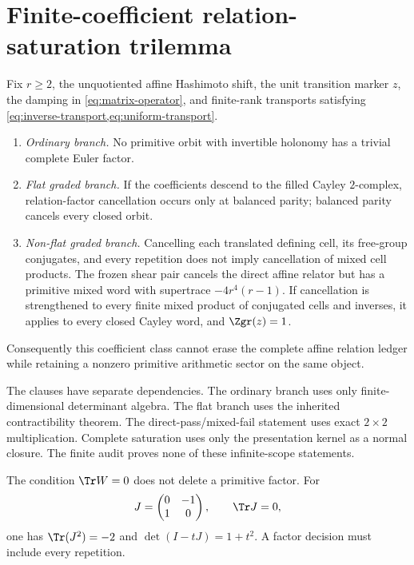 \section{Finite-coefficient relation-saturation trilemma}
\label{sec:theorem}

\begin{theorem}
\label{thm:saturation}
Fix $r\ge2$, the unquotiented affine Hashimoto shift, the unit transition
marker $z$, the damping in \cref{eq:matrix-operator}, and finite-rank
transports satisfying \cref{eq:inverse-transport,eq:uniform-transport}.
\begin{enumerate}
  \item \emph{Ordinary branch.}  No primitive orbit with invertible holonomy
  has a trivial complete Euler factor.
  \item \emph{Flat graded branch.}  If the coefficients descend to the filled
  Cayley $2$-complex, relation-factor cancellation occurs only at balanced
  parity; balanced parity cancels every closed orbit.
  \item \emph{Non-flat graded branch.}  Cancelling each translated defining
  cell, its free-group conjugates, and every repetition does not imply
  cancellation of mixed cell products.  The frozen shear pair cancels the
  direct affine relator but has a primitive mixed word with supertrace
  $-4r^4(r-1)$.  If cancellation is strengthened to every finite mixed
  product of conjugated cells and inverses, it applies to every closed Cayley
  word, and $\Zgr(z)=1$.
\end{enumerate}
Consequently this coefficient class cannot erase the complete affine relation
ledger while retaining a nonzero primitive arithmetic sector on the same
object.
\end{theorem}

The clauses have separate dependencies.  The ordinary branch uses only
finite-dimensional determinant algebra.  The flat branch uses the inherited
contractibility theorem.  The direct-pass/mixed-fail statement uses exact
$2\times2$ multiplication.  Complete saturation uses only the presentation
kernel as a normal closure.  The finite audit proves none of these
infinite-scope statements.

\begin{corollary}
\label{cor:first-trace}
The condition $\Tr W=0$ does not delete a primitive factor.  For
\[
  J=\begin{pmatrix}0&-1\\1&0\end{pmatrix},
  \qquad \Tr J=0,
\]
one has $\Tr(J^2)=-2$ and $\det(I-tJ)=1+t^2$.  A factor decision must include
every repetition.
\end{corollary}

